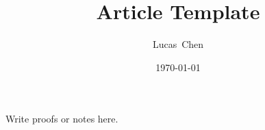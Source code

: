 \documentclass{amsart}
\title{Article Template}
\author{Lucas\ Chen}
\date{\today}
\begin{document}
\maketitle

Write proofs or notes here.
\end{document}
